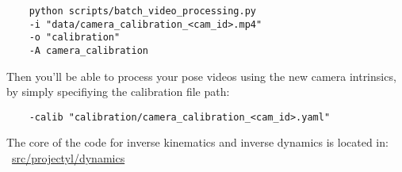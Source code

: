 \begin{verbatim}
    python scripts/batch_video_processing.py
    -i "data/camera_calibration_<cam_id>.mp4"
    -o "calibration"
    -A camera_calibration
\end{verbatim}

Then you'll be able to process your pose videos using the new camera intrinsics, by simply specifiying
the calibration file path:
\begin{verbatim}
    -calib "calibration/camera_calibration_<cam_id>.yaml"
\end{verbatim}

The core of the code for inverse kinematics and inverse dynamics is located in:
~\href{https://github.com/balthazarneveu/monocular_pose_and_forces_estimation/tree/main/src/projectyl/dynamics}{src/projectyl/dynamics}